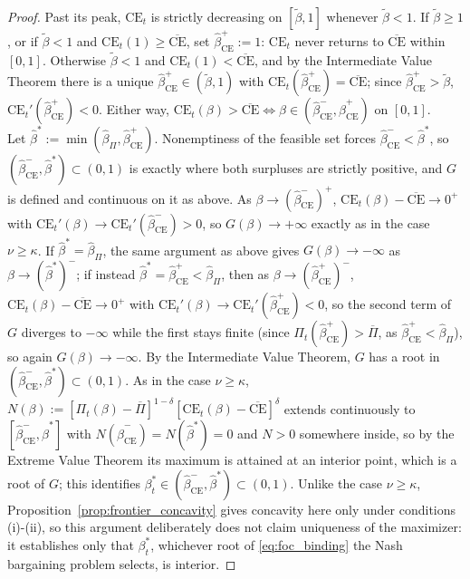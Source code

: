\documentclass{article}
\theoremstyle{definition}
\theoremstyle{plain}
\begin{document}
\begin{appendices}
\begin{proof}
Past its peak, $\text{CE}_t$ is strictly decreasing on $[\tilde\beta,1]$ whenever $\tilde\beta<1$. If $\tilde\beta\ge1$, or if $\tilde\beta<1$ and $\text{CE}_t(1)\ge\overline{\text{CE}}$, set $\widehat\beta_{\mathrm{CE}}^{+}:=1$: $\text{CE}_t$ never returns to $\overline{\text{CE}}$ within $[0,1]$. Otherwise $\tilde\beta<1$ and $\text{CE}_t(1)<\overline{\text{CE}}$, and by the Intermediate Value Theorem there is a unique $\widehat\beta_{\mathrm{CE}}^{+}\in(\tilde\beta,1)$ with $\text{CE}_t(\widehat\beta_{\mathrm{CE}}^{+})=\overline{\text{CE}}$; since $\widehat\beta_{\mathrm{CE}}^{+}>\tilde\beta$, $\text{CE}_t'(\widehat\beta_{\mathrm{CE}}^{+})<0$. Either way, $\text{CE}_t(\beta)>\overline{\text{CE}} \iff \beta\in(\widehat\beta_{\mathrm{CE}}^{-},\widehat\beta_{\mathrm{CE}}^{+})$ on $[0,1]$.\\
Let $\widehat\beta^{*}:=\min(\widehat\beta_\Pi,\widehat\beta_{\mathrm{CE}}^{+})$. Nonemptiness of the feasible set forces $\widehat\beta_{\mathrm{CE}}^{-}<\widehat\beta^{*}$, so $(\widehat\beta_{\mathrm{CE}}^{-},\widehat\beta^{*})\subset(0,1)$ is exactly where both surpluses are strictly positive, and $G$ is defined and continuous on it as above. As $\beta\to(\widehat\beta_{\mathrm{CE}}^{-})^+$, $\text{CE}_t(\beta)-\overline{\text{CE}}\to0^+$ with $\text{CE}_t'(\beta)\to\text{CE}_t'(\widehat\beta_{\mathrm{CE}}^{-})>0$, so $G(\beta)\to+\infty$ exactly as in the case $\nu\ge\kappa$. If $\widehat\beta^{*}=\widehat\beta_\Pi$, the same argument as above gives $G(\beta)\to-\infty$ as $\beta\to(\widehat\beta^{*})^-$; if instead $\widehat\beta^{*}=\widehat\beta_{\mathrm{CE}}^{+}<\widehat\beta_\Pi$, then as $\beta\to(\widehat\beta_{\mathrm{CE}}^{+})^-$, $\text{CE}_t(\beta)-\overline{\text{CE}}\to0^+$ with $\text{CE}_t'(\beta)\to\text{CE}_t'(\widehat\beta_{\mathrm{CE}}^{+})<0$, so the second term of $G$ diverges to $-\infty$ while the first stays finite (since $\Pi_t(\widehat\beta_{\mathrm{CE}}^{+})>\overline\Pi$, as $\widehat\beta_{\mathrm{CE}}^{+}<\widehat\beta_\Pi$), so again $G(\beta)\to-\infty$. By the Intermediate Value Theorem, $G$ has a root in $(\widehat\beta_{\mathrm{CE}}^{-},\widehat\beta^{*})\subset(0,1)$. As in the case $\nu\ge\kappa$, $N(\beta):=[\Pi_t(\beta)-\overline\Pi]^{1-\delta}[\text{CE}_t(\beta)-\overline{\text{CE}}]^{\delta}$ extends continuously to $[\widehat\beta_{\mathrm{CE}}^{-},\widehat\beta^{*}]$ with $N(\widehat\beta_{\mathrm{CE}}^{-})=N(\widehat\beta^{*})=0$ and $N>0$ somewhere inside, so by the Extreme Value Theorem its maximum is attained at an interior point, which is a root of $G$; this identifies $\beta_t^*\in(\widehat\beta_{\mathrm{CE}}^{-},\widehat\beta^{*})\subset(0,1)$. Unlike the case $\nu\ge\kappa$, Proposition~\ref{prop:frontier_concavity} gives concavity here only under conditions (i)-(ii), so this argument deliberately does not claim uniqueness of the maximizer: it establishes only that $\beta_t^*$, whichever root of \eqref{eq:foc_binding} the Nash bargaining problem selects, is interior.

\end{proof}
\end{appendices}
\end{document}
